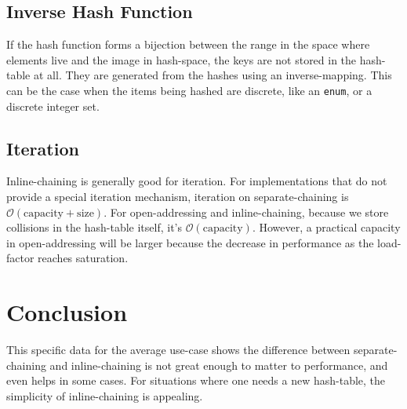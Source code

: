\documentclass[12pt]{article}
\newcommand{\code}[1]{\colorbox{light-gray}{\texttt{#1}}}
\begin{document}
\subsection{Inverse Hash Function}

If the hash function forms a bijection between the range in the space where elements live and the image in hash-space, the keys are not stored in the hash-table at all. They are generated from the hashes using an inverse-mapping. This can be the case when the items being hashed are discrete, like an \code{enum}, or a discrete integer set.

\subsection{Iteration}

Inline-chaining is generally good for iteration. For implementations that do not provide a special iteration mechanism, iteration on separate-chaining is $\mathcal{O}(\text{capacity} + \text{size})$. For open-addressing and inline-chaining, because we store collisions in the hash-table itself, it's $\mathcal{O}(\text{capacity})$. However, a practical capacity in open-addressing will be larger because the decrease in performance as the load-factor reaches saturation.

\section{Conclusion}

This specific data for the average use-case shows the difference between separate-chaining and inline-chaining is not great enough to matter to performance, and even helps in some cases. For situations where one needs a new hash-table, the simplicity of inline-chaining is appealing.


\end{document}

